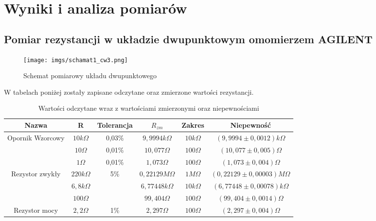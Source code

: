 {\section{Wyniki i analiza pomiarów}}

\subsection{Pomiar rezystancji w układzie dwupunktowym omomierzem AGILENT} %

\begin{figure}[!h]
    \centering
    \texttt{[image: imgs/schamat1\_cw3.png]}
    \caption{Schemat pomiarowy układu dwupunktowego}
    \label{fig:enter-label}
\end{figure}

\newpage
W tabelach poniżej zostały zapisane odczytane oraz zmierzone wartości rezystancji.

\begin{table}[!h]
    \centering
    \begin{tabular}{|c|c|c||c|c|c|}\hline
        Nazwa                             & R            & Tolerancja           & $R_{zm}$         & Zakres      & Niepewność \\ \hline
      \multirow{3}{*}{Opornik Wzorcowy}   & $10k\Omega$  & 0,03\%               & $9,9994k\Omega$  & $10k\Omega$ & $(9,9994 \pm 0,0012)k\Omega$ \\ 
                                          & $10\Omega$   & 0,01\%               & $10,077\Omega$   & $100\Omega$ & $(10,077 \pm 0,005)\Omega$  \\ 
                                          & $1\Omega$    & 0,01\%               & $1,073\Omega$    & $100\Omega$ & $(1,073 \pm 0,004)\Omega$  \\ \hline
      \multirow{3}{*}{Rezystor zwykły}    & $220k\Omega$ & \multirow{3}{*}{5\%} & $0,22129M\Omega$ & $1M\Omega$  & $(0,22129 \pm 0,00003)M\Omega$ \\
                                          & $6,8k\Omega$ &                      & $6,77448k\Omega$ & $10k\Omega$ & $(6,77448 \pm 0,00078)k\Omega$ \\
                                          & $100\Omega$  &                      & $99,404\Omega$   & $100\Omega$ & $(99,404 \pm 0,0014)\Omega$ \\ \hline
                            Rezystor mocy & $2,2\Omega$  & 1\%                  & $2,297\Omega$    & $100\Omega$ & $(2,297 \pm 0,004)\Omega$ \\ \hline
    \end{tabular}
    \caption{Wartości odczytane wraz z wartościami zmierzonymi oraz niepewnościami}
    \label{tab:my_label}
\end{table}

